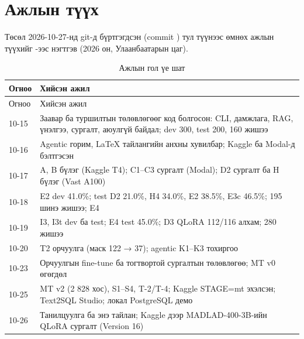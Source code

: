
\chapter{Ажлын түүх}
\label{app:history}

Төсөл 2026-10-27-нд git-д бүртгэгдсэн (commit ) тул түүнээс өмнөх ажлын түүхийг -ээс
нэгтгэв (2026 он, Улаанбаатарын цаг).

\begin{longtable}{p{2.0cm}p{12.0cm}}
\caption{Ажлын гол үе шат}\label{tab:history}\\
\toprule
Огноо & Хийсэн ажил \\
\midrule
\endfirsthead
\toprule
Огноо & Хийсэн ажил \\
\midrule
\endhead
10-15 & Заавар ба туршилтын төлөвлөгөөг код болгосон: CLI, дамжлага, RAG, үнэлгээ, сургалт, аюулгүй байдал; dev 300, test 200, 160 жишээ \\
10-16 & Agentic горим, LaTeX тайлангийн анхны хувилбар; Kaggle ба Modal-д бэлтгэсэн \\
10-17 & A, B бүлэг (Kaggle T4); C1--C3 сургалт (Modal); D2 сургалт ба H бүлэг (Vast A100) \\
10-18 & E2 dev 41.0\%; test D2 21.0\%, H4 34.0\%, E2 38.5\%, E3c 46.5\%; 195 шинэ жишээ; E4 \\
10-19 & I3, I3t dev ба test; E4 test 45.0\%; D3 QLoRA 112/116 алхам; 280 жишээ \\
10-20 & T2 орчуулга (маск 122 → 37); agentic K1--K3 тохиргоо \\
10-23 & Орчуулгын fine-tune ба тогтвортой сургалтын төлөвлөгөө; MT v0 өгөгдөл \\
10-25 & MT v2 (2 828 хос), S1--S4, T-2/T-4; Kaggle STAGE=mt эхэлсэн; Text2SQL Studio; локал PostgreSQL демо \\
10-26 & Танилцуулга ба энэ тайлан; Kaggle дээр MADLAD-400-3B-ийн QLoRA сургалт (Version 16) \\
\bottomrule
\end{longtable}
